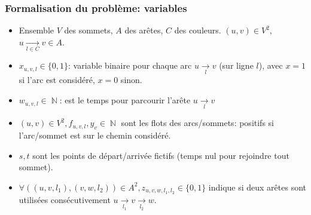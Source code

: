 \documentclass[10pt]{beamer}
\DeclareMathOperator{\NN}{\mathbb{N}}
\begin{document}
\begin{frame}
\frametitle{Formalisation du problème: variables}

\begin{itemize}
\item Ensemble $V$ des sommets, $A$ des arêtes, $C$ des couleurs.
$(u,v)\in V^2$, $u \xrightarrow[l\in C]{} v\in A$.

\item $x_{u,v,l}\in \lbrace 0,1 \rbrace$: variable binaire pour chaque arc $u \xrightarrow[l]{} v$ (sur ligne $l$), avec $x=1$ si l'arc est considéré, $x=0$ sinon.

\item $w_{u,v,l}\in \NN$: est le temps pour parcourir l'arête $u \xrightarrow[l]{} v$

\item $(u,v)\in V^2, f_{u,v,l}, y_v \in\NN$ sont les flots des arcs/sommets: positifs si l'arc/sommet est sur le chemin considéré.

\item $s, t$ sont les points de départ/arrivée fictifs (temps nul pour rejoindre tout sommet).
\item  $\forall ((u,v,l_1), (v,w,l_2)) \in A^2, z_{u,v,w,l_1,l_2} \in \lbrace 0,1 \rbrace$ indique si deux arêtes sont utilisées consécutivement $u \xrightarrow[l_1]{} v\xrightarrow[l_2]{} w$.
\end{itemize}
\end{frame}
\end{document}
